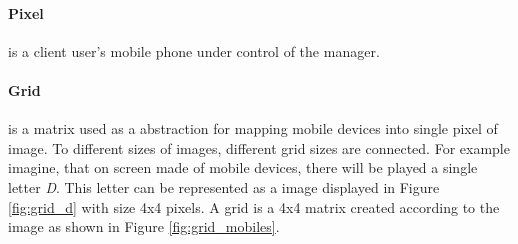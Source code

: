 \paragraph{Pixel} is a client user's mobile phone under control of the manager.

\paragraph{Grid} is a matrix used as a abstraction for mapping mobile devices into single pixel of image.
To different sizes of images, different grid sizes are connected. 
For example imagine, that on screen made of mobile devices, there will be played a single letter \emph{D}.
This letter can be represented as a image displayed in Figure \ref{fig:grid_d} with size 4x4 pixels.
A grid is a 4x4 matrix created according to the image as shown in Figure \ref{fig:grid_mobiles}.

